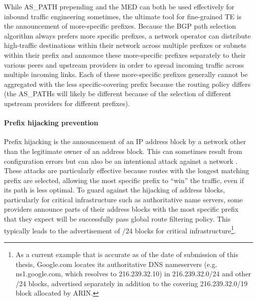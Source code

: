 While AS\_PATH prepending and the MED can both be used effectively for inbound
traffic engineering sometimes, the ultimate tool for fine-grained TE is the
announcement of more-specific prefixes. Because the BGP path selection
algorithm always prefers more specific prefixes, a network operator can
distribute high-traffic destinations within their network across multiple
prefixes or subnets within their prefix and announce these more-specific
prefixes separately to their various peers and upstream providers in order to
spread incoming traffic across multiple incoming links. Each of these
more-specific prefixes generally cannot be aggregated with the less
specific-covering prefix because the routing policy differs (the AS\_PATHs will
likely be different because of the selection of different upstream providers
for different prefixes).



\paragraph{Prefix hijacking prevention}

Prefix hijacking is the announcement of an IP address block by a network other
than the legitimate owner of an address block. This can sometimes result from
configuration errors \cite{Brown:2008hc} but can also be an intentional attack
against a network \cite{Pilosov:2008ij}. These attacks are particularly
effective because routes with the longest matching prefix are selected,
allowing the most specific prefix to ``win'' the traffic, even if its path is
less optimal. To guard against the hijacking of address blocks, particularly
for critical infrastructure such as authoritative name servers, some providers
announce parts of their address blocks with the most specific prefix that they
expect will be successfully pass global route filtering policy. This typically
leads to the advertisement of /24 blocks for critical
infrastructure\footnote{As a current example that is accurate as of the date of
submission of this thesis, Google.com locates its authoritative DNS nameservers
(e.g. ns1.google.com, which resolves to 216.239.32.10) in 216.239.32.0/24 and
other /24 blocks, advertised separately in addition to the covering
216.239.32.0/19 block allocated by ARIN.}.

